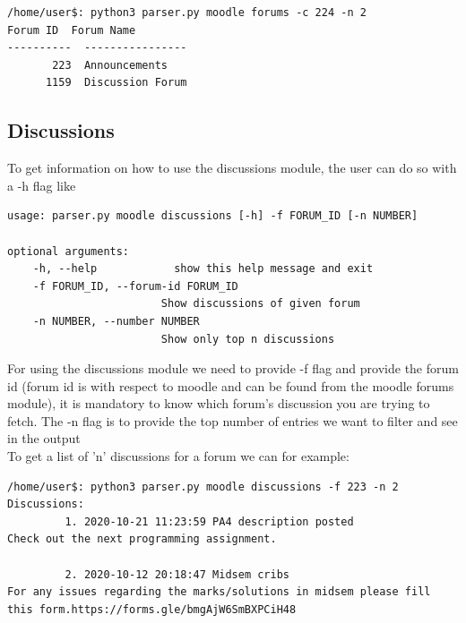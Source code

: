 \documentclass[12pt, letterpaper, twoside]{article}
\begin{document}
\begin{verbatim}
/home/user$: python3 parser.py moodle forums -c 224 -n 2
Forum ID  Forum Name
----------  ----------------
       223  Announcements
      1159  Discussion Forum
\end{verbatim}

\subsection{Discussions}
To get information on how to use the discussions module, the user can do so with a -h flag like 
\begin{verbatim}
usage: parser.py moodle discussions [-h] -f FORUM_ID [-n NUMBER]

optional arguments:
    -h, --help            show this help message and exit
    -f FORUM_ID, --forum-id FORUM_ID
                        Show discussions of given forum
    -n NUMBER, --number NUMBER
                        Show only top n discussions    
\end{verbatim}
For using the discussions module we need to provide -f flag and provide the forum id (forum id is with respect to moodle and can be found from the moodle forums module), it is mandatory to know which forum's discussion you are trying to fetch. The -n flag is to provide the top number of entries we want to filter and see in the output\\
To get a list of 'n' discussions for a forum we can for example:

\begin{verbatim}
/home/user$: python3 parser.py moodle discussions -f 223 -n 2
Discussions:
         1. 2020-10-21 11:23:59 PA4 description posted
Check out the next programming assignment. 

         2. 2020-10-12 20:18:47 Midsem cribs
For any issues regarding the marks/solutions in midsem please fill this form.https://forms.gle/bmgAjW6SmBXPCiH48
\end{verbatim}
\end{document}

